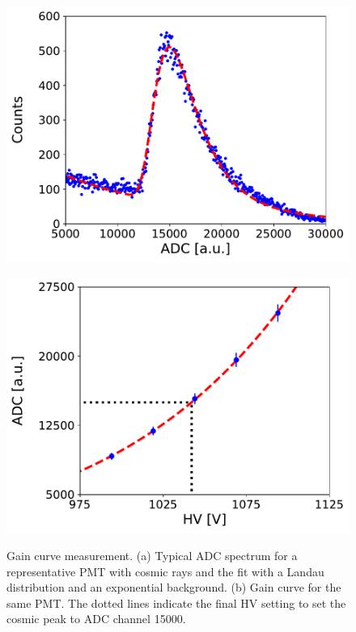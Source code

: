 \documentclass[3p,final,twocolumn]{elsarticle}
\begin{document}
\begin{figure}[th]
	\centering
		\begin{minipage}{0.48\textwidth}
			\includegraphics[width=\textwidth]{adc-fit-example.pdf}
					\subcaption{}
			\label{fig:adc-spectrum}
		\end{minipage}
		\begin{minipage}{0.47\textwidth}
			\includegraphics[width=\textwidth]{gainfit.pdf}
			\subcaption{}
		\label{fig:gain-curve}
		\end{minipage}
		\caption{Gain curve measurement. (a) Typical ADC spectrum for a representative PMT with cosmic rays
                  and the fit with a Landau distribution and an exponential background. (b) Gain curve for the same
                  PMT. The dotted lines indicate the final HV setting to set the cosmic peak to ADC channel 15000. }
\end{figure}
\end{document}
